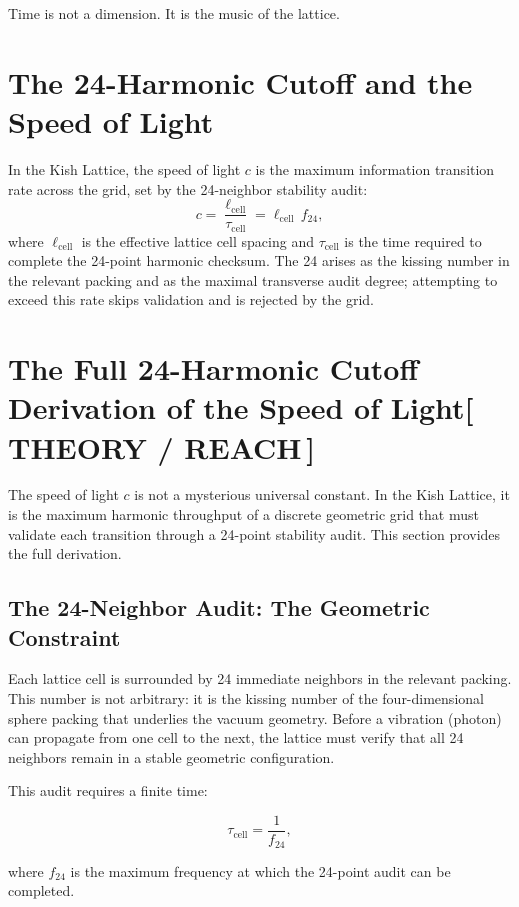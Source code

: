 \documentclass[12pt,oneside]{book}
\newcommand{\TheoryTag}{\;\colorbox{theorytag!15}{\textcolor{theorytag}{\footnotesize\bfseries [\,THEORY / REACH\,]}}}
\begin{document}
Time is not a dimension. It is the music of the lattice.



\section{The 24-Harmonic Cutoff and the Speed of Light}

In the Kish Lattice, the speed of light \(c\) is the maximum information
transition rate across the grid, set by the 24-neighbor stability audit:
\begin{equation}
c
=
\frac{\ell_{\text{cell}}}{\tau_{\text{cell}}}
=
\ell_{\text{cell}}\,f_{24},
\end{equation}
where \(\ell_{\text{cell}}\) is the effective lattice cell spacing and \(\tau_{\text{cell}}\) is the
time required to complete the 24-point harmonic checksum. The 24 arises as the
kissing number in the relevant packing and as the maximal transverse audit
degree; attempting to exceed this rate skips validation and is rejected by the
grid.

\section{The Full 24-Harmonic Cutoff Derivation of the Speed of Light\TheoryTag}

The speed of light \(c\) is not a mysterious universal constant. In the Kish Lattice, it is
the maximum harmonic throughput of a discrete geometric grid that must validate each
transition through a 24-point stability audit. This section provides the full derivation.

\subsection{The 24-Neighbor Audit: The Geometric Constraint}

Each lattice cell is surrounded by 24 immediate neighbors in the relevant packing. This
number is not arbitrary: it is the kissing number of the four-dimensional sphere packing
that underlies the vacuum geometry. Before a vibration (photon) can propagate from one
cell to the next, the lattice must verify that all 24 neighbors remain in a stable geometric
configuration.

This audit requires a finite time:


\[
\tau_{\text{cell}} = \frac{1}{f_{24}},
\]


where \(f_{24}\) is the maximum frequency at which the 24-point audit can be completed.
\end{document}
